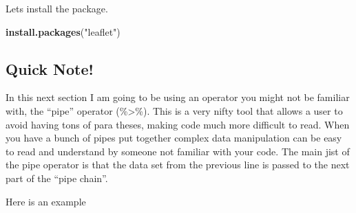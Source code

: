 \documentclass[]{article}
\newenvironment{Shaded}{\begin{snugshade}}{\end{snugshade}}
\newcommand{\CommentTok}[1]{\textcolor[rgb]{0.56,0.35,0.01}{\textit{#1}}}
\newcommand{\DecValTok}[1]{\textcolor[rgb]{0.00,0.00,0.81}{#1}}
\newcommand{\KeywordTok}[1]{\textcolor[rgb]{0.13,0.29,0.53}{\textbf{#1}}}
\newcommand{\NormalTok}[1]{#1}
\newcommand{\OperatorTok}[1]{\textcolor[rgb]{0.81,0.36,0.00}{\textbf{#1}}}
\newcommand{\StringTok}[1]{\textcolor[rgb]{0.31,0.60,0.02}{#1}}
\begin{document}
Lets install the package.

\begin{Shaded}
\begin{Highlighting}[]
\KeywordTok{install.packages}\NormalTok{(}\StringTok{"leaflet"}\NormalTok{)}
\end{Highlighting}
\end{Shaded}

\hypertarget{quick-note}{%
\subsection{Quick Note!}\label{quick-note}}

In this next section I am going to be using an operator you might not be
familiar with, the ``pipe'' operator (\%\textgreater{}\%). This is a
very nifty tool that allows a user to avoid having tons of para theses,
making code much more difficult to read. When you have a bunch of pipes
put together complex data manipulation can be easy to read and
understand by someone not familiar with your code. The main jist of the
pipe operator is that the data set from the previous line is passed to
the next part of the ``pipe chain''.

Here is an example

\begin{Shaded}
\end{Shaded}
\end{document}
